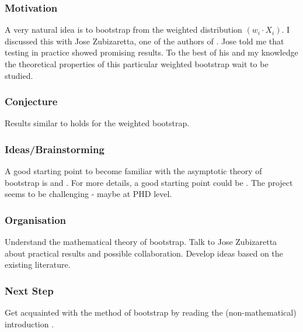 \subsubsection{Motivation}
A very natural idea is to bootstrap from the weighted distribution
$
(w_i\cdot X_i)
$.
I discussed this with Jose Zubizaretta, one of the authors of \cite{Wang2019, Wang2023}.
Jose told me that testing in practice showed promising results.
To the best of his and my knowledge the theoretical properties of this particular weighted bootstrap wait to be studied.
\subsubsection{Conjecture}
Results similar to \cite[Theorem~23.5]{Vaart2000} holds for the weighted bootstrap.
\subsubsection{Ideas/Brainstorming}
A good starting point to become familiar with the asymptotic theory of bootstrap is \cite[§3.6]{vaart2013} and \cite[§23]{Vaart2000}.
For more details, a good starting point could be \cite{Barbe95}.
The project seems to be challenging - maybe at PHD level.
\subsubsection{Organisation}
Understand the mathematical theory of bootstrap.
Talk to Jose Zubizaretta about practical results and possible collaboration.
Develop ideas based on the existing literature.
\subsubsection{Next Step}
Get acquainted with the method of bootstrap by reading the (non-mathematical) introduction \cite{Efron1994}.

